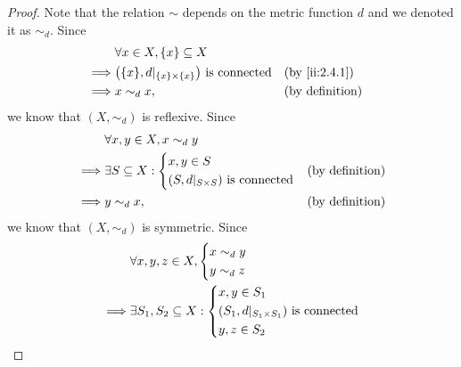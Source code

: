 \begin{proof}
  Note that the relation \(\sim\) depends on the metric function \(d\) and we denoted it as \(\sim_d\).
  Since
  \begin{align*}
             & \forall x \in X, \set{x} \subseteq X                                                            \\
    \implies & \big(\set{x}, d|_{\set{x} \times \set{x}}\big) \text{ is connected} &  & \by{ii:2.4.1}          \\
    \implies & x \sim_d x,                                                         &  & \text{(by definition)}
  \end{align*}
  we know that \((X, \sim_d)\) is reflexive.
  Since
  \begin{align*}
             & \forall x, y \in X, x \sim_d y                                        \\
    \implies & \exists S \subseteq X : \begin{dcases}
                                         x, y \in S \\
                                         (S, d|_{S \times S}) \text{ is connected}
                                       \end{dcases} &  & \text{(by definition)}      \\
    \implies & y \sim_d x,                               &  & \text{(by definition)}
  \end{align*}
  we know that \((X, \sim_d)\) is symmetric.
  Since
  \begin{align*}
             & \forall x, y, z \in X, \begin{dcases}
                                        x \sim_d y \\
                                        y \sim_d z
                                      \end{dcases}                                                                                                     \\
    \implies & \exists S_1, S_2 \subseteq X : \begin{dcases}
                                                x, y \in S_1                                    \\
                                                (S_1, d|_{S_1 \times S_1}) \text{ is connected} \\
                                                y, z \in S_2                                    \\

\end{dcases}
\end{align*}
\end{proof}
